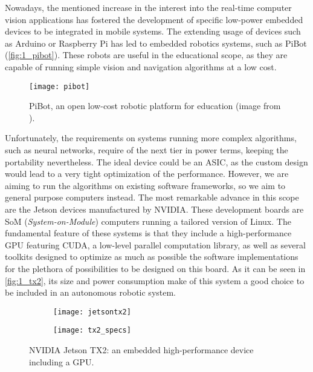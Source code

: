 Nowadays, the mentioned increase in the interest into the real-time computer vision applications has fostered the development of specific low-power embedded devices to be integrated in mobile systems. The extending usage of devices such as Arduino or Raspberry Pi has led to embedded robotics systems, such as PiBot \cite{pibot} (\autoref{fig:1_pibot}). These robots are useful in the educational scope, as they are capable of running simple vision and navigation algorithms at a low cost.
\begin{figure}[h]
	\centering
	\texttt{[image: pibot]}
	\caption{PiBot, an open low-cost robotic platform for education (image from \cite{pibot}).}
	\label{fig:1_pibot}
\end{figure}
Unfortunately, the requirements on systems running more complex algorithms, such as neural networks, require of the next tier in power terms, keeping the portability nevertheless. The ideal device could be an ASIC, as the custom design would lead to a very tight optimization of the performance. However, we are aiming to run the algorithms on existing software frameworks, so we aim to general purpose computers instead. The most remarkable advance in this scope are the Jetson devices manufactured by NVIDIA. These development boards are SoM (\textit{System-on-Module}) computers running a tailored version of Linux. The fundamental feature of these systems is that they include a high-performance GPU featuring CUDA, a low-level parallel computation library, as well as several toolkits designed to optimize as much as possible the software implementations for the plethora of possibilities to be designed on this board. As it can be seen in \autoref{fig:1_tx2}, its size and power consumption make of this system a good choice to be included in an autonomous robotic system. 
\begin{figure}[h]
	\begin{subfigure}[h]{0.45\linewidth}
		\centering
		\texttt{[image: jetsontx2]}

	\end{subfigure}
	\begin{subfigure}[h]{0.45\linewidth}
		\centering
		\texttt{[image: tx2\_specs]}
	\end{subfigure}
	\caption{NVIDIA Jetson TX2: an embedded high-performance device including a GPU.}
	\label{fig:1_tx2}
\end{figure}


